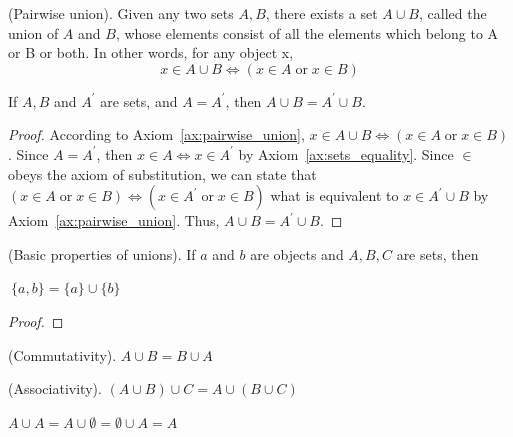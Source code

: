\begin{axiom}
     \textup{(Pairwise union)}. Given any two sets $A, B$, there exists a set $A \cup B$, called the union of $A$ and $B$, whose elements consist of all the elements which belong to A or B or both. In other words, for any object x,
     \begin{equation*}
        x \in A \cup B \Leftrightarrow (x\in A \; \text{or} \; x \in B)
     \end{equation*}\label{ax:pairwise_union}
\end{axiom}
\begin{subsequence}
    \begin{proposition}
        \color{red}
        If $A, B$ and $A^\prime$ are sets, and $A=A^\prime$, then $A\cup B = A^\prime\cup B$. 
    \end{proposition}
    \begin{proof} 
        According to Axiom~\ref{ax:pairwise_union}, $ x \in A \cup B \Leftrightarrow (x\in A \; \text{or} \; x \in B)$. Since $A = A^\prime$, then $x \in A \Leftrightarrow x \in A^\prime$ by Axiom~\ref{ax:sets_equality}. Since $\in$ obeys the axiom of substitution, we can state that $(x\in A \; \text{or} \; x \in B) \Leftrightarrow (x\in A^\prime \; \text{or} \; x \in B)$ what is equivalent to $x \in A^\prime \cup B$ by Axiom~\ref{ax:pairwise_union}. Thus, $A\cup B = A^\prime \cup B$.  
    \end{proof}
\end{subsequence}

\begin{lemma}
    \textup{(Basic properties of unions). If $a$ and $b$ are objects and $A, B, C$ are sets, then}
\end{lemma}
\begin{subsequence}
    \begin{lemma}
        $~\{a, b\} = \{a\} \cup \{b\}$
    \end{lemma}
    \begin{proof}
        
    \end{proof}
    \begin{lemma}
        \textup{(Commutativity).} $A\cup B = B\cup A$
    \end{lemma}
    \begin{lemma}
        \textup{(Associativity).} $(A\cup B) \cup C = A \cup (B\cup C)$
    \end{lemma}
    \begin{lemma}
        $A\cup A = A\cup \emptyset=\emptyset \cup A = A$
    \end{lemma}
\end{subsequence}